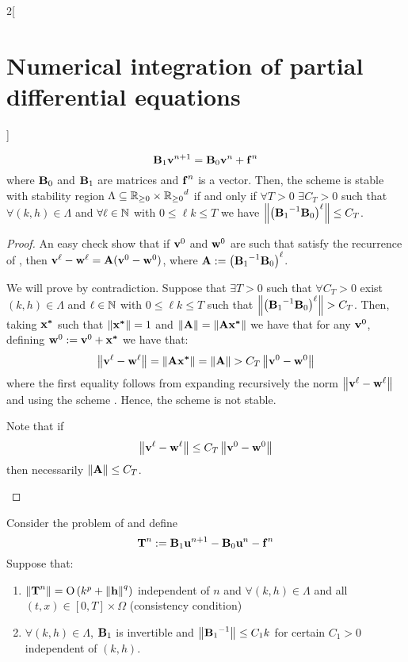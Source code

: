 \documentclass[../../../main_math.tex]{subfiles}
\begin{document}
\begin{multicols}{2}[\section{Numerical integration of partial differential equations}]
\begin{proposition}
\begin{equation}
      \boldsymbol{\mathrm{B}}_1\boldsymbol{\mathrm{v}}^{n+1}=\boldsymbol{\mathrm{B}}_0\boldsymbol{\mathrm{v}}^n+\boldsymbol{\mathrm{f}}^n
    \end{equation}
    where $\boldsymbol{\mathrm{B}}_0$ and $\boldsymbol{\mathrm{B}}_1$ are matrices and $\boldsymbol{\mathrm{f}}^n$ is a vector. Then, the scheme is stable with stability region $\Lambda\subseteq \mathbb{R}_{\geq 0}\times{\ensuremath{\mathbb{R}}_{\geq 0}}^d$ if and only if $\forall T>0$ $\exists C_T>0$ such that $\forall (k,h)\in\Lambda$ and $\forall \ell\in\mathbb{N}$ with $0\leq \ell k\leq T$ we have $\left\|{\left({\boldsymbol{\mathrm{B}}_1}^{-1}\boldsymbol{\mathrm{B}}_0\right)}^\ell\right\|\leq C_T$.
  \end{proposition}
  \begin{proof}
    An easy check show that if $\boldsymbol{\mathrm{v}}^0$ and $\boldsymbol{\mathrm{w}}^0$ are such that satisfy the recurrence of , then ${\boldsymbol{\mathrm{v}}^\ell -\boldsymbol{\mathrm{w}}^\ell}=\boldsymbol{\mathrm{A}}(\boldsymbol{\mathrm{v}}^0-\boldsymbol{\mathrm{w}}^0)$, where $\boldsymbol{\mathrm{A}}:= {\left({\boldsymbol{\mathrm{B}}_1}^{-1}\boldsymbol{\mathrm{B}}_0\right)}^\ell$.
    \begin{itemizeiff}
      We will prove by contradiction. Suppose that $\exists T>0$ such that $\forall C_T>0$ exist $(k,h)\in \Lambda$ and $\ell \in \mathbb{N}$ with $0\leq \ell k\leq T$ such that $\norm{{\left({\vf{B}_1}^{-1}\vf{B}_0\right)}^\ell}> C_T$. Then, taking $\boldsymbol{\mathrm{x^*}}$ such that $\left\|\boldsymbol{\mathrm{x^*}}\right\|=1$ and $\left\|\boldsymbol{\mathrm{A}}\right\|=\left\|\boldsymbol{\mathrm{A}}\boldsymbol{\mathrm{x^*}}\right\|$ we have that for any $\boldsymbol{\mathrm{v}}^0$, defining $\boldsymbol{\mathrm{w}}^0:=\boldsymbol{\mathrm{v}}^0+\boldsymbol{\mathrm{x^*}}$ we have that:
      \begin{multline*}
        \norm{\vf{v}^\ell -\vf{w}^\ell}= \norm{\vf{A} \vf{x^*}}=\norm{\vf{A}}>C_T\norm{\vf{v}^0-\vf{w}^0}
      \end{multline*}
      where the first equality follows from expanding recursively the norm $\left\|\boldsymbol{\mathrm{v}}^\ell -\boldsymbol{\mathrm{w}}^\ell\right\|$ and using the scheme . Hence, the scheme is not stable.
      \item Note that if
      $$
        \left\|\boldsymbol{\mathrm{v}}^\ell -\boldsymbol{\mathrm{w}}^\ell\right\|\leq C_T\left\|\boldsymbol{\mathrm{v}}^0-\boldsymbol{\mathrm{w}}^0\right\|
      $$
      then necessarily $\left\|\boldsymbol{\mathrm{A}}\right\|\leq C_T$.
    \end{itemizeiff}
  \end{proof}
  \begin{theorem}
    Consider the problem of  and define
    $$
      \boldsymbol{\mathrm{T}}^n:=\boldsymbol{\mathrm{B}}_1\boldsymbol{\mathrm{u}}^{n+1}-\boldsymbol{\mathrm{B}}_0\boldsymbol{\mathrm{u}}^n -\boldsymbol{\mathrm{f}}^n
    $$
    Suppose that:
    \begin{enumerate}
      \item $\left\|\boldsymbol{\mathrm{T}}^n\right\|=\mathrm{O}\left(k^p+\left\|\boldsymbol{\mathrm{h}}\right\|^q\right)$ independent of $n$ and $\forall (k,h)\in\Lambda$ and all $(t,x)\in[0,T]\times\Omega$ (consistency condition)
      \item $\forall (k,h)\in\Lambda$, $\boldsymbol{\mathrm{B}}_1$ is invertible and $\left\|{\boldsymbol{\mathrm{B}}_1}^{-1}\right\|\leq C_1k$ for certain $C_1>0$ independent of $(k,h)$.

\end{enumerate}
\end{theorem}
\end{multicols}
\end{document}
